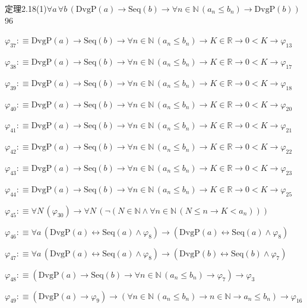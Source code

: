 \begin{fullproof}{定理2.18(1)}{$\forall a\,\forall b\,(\mathrm{DvgP}(a) \to \mathrm{Seq}(b) \to \forall n \in \mathbb{N}\,(a_{n} \leq b_{n}) \to \mathrm{DvgP}(b))$}{96}
\begin{abbrevlist}
\item $\varphi_{37} :\equiv \mathrm{DvgP}(a) \to \mathrm{Seq}(b) \to \forall n \in \mathbb{N}\,(a_{n} \leq b_{n}) \to K \in \mathbb{R} \to 0 < K \to \varphi_{13}$
\item $\varphi_{38} :\equiv \mathrm{DvgP}(a) \to \mathrm{Seq}(b) \to \forall n \in \mathbb{N}\,(a_{n} \leq b_{n}) \to K \in \mathbb{R} \to 0 < K \to \varphi_{17}$
\item $\varphi_{39} :\equiv \mathrm{DvgP}(a) \to \mathrm{Seq}(b) \to \forall n \in \mathbb{N}\,(a_{n} \leq b_{n}) \to K \in \mathbb{R} \to 0 < K \to \varphi_{18}$
\item $\varphi_{40} :\equiv \mathrm{DvgP}(a) \to \mathrm{Seq}(b) \to \forall n \in \mathbb{N}\,(a_{n} \leq b_{n}) \to K \in \mathbb{R} \to 0 < K \to \varphi_{20}$
\item $\varphi_{41} :\equiv \mathrm{DvgP}(a) \to \mathrm{Seq}(b) \to \forall n \in \mathbb{N}\,(a_{n} \leq b_{n}) \to K \in \mathbb{R} \to 0 < K \to \varphi_{21}$
\item $\varphi_{42} :\equiv \mathrm{DvgP}(a) \to \mathrm{Seq}(b) \to \forall n \in \mathbb{N}\,(a_{n} \leq b_{n}) \to K \in \mathbb{R} \to 0 < K \to \varphi_{22}$
\item $\varphi_{43} :\equiv \mathrm{DvgP}(a) \to \mathrm{Seq}(b) \to \forall n \in \mathbb{N}\,(a_{n} \leq b_{n}) \to K \in \mathbb{R} \to 0 < K \to \varphi_{23}$
\item $\varphi_{44} :\equiv \mathrm{DvgP}(a) \to \mathrm{Seq}(b) \to \forall n \in \mathbb{N}\,(a_{n} \leq b_{n}) \to K \in \mathbb{R} \to 0 < K \to \varphi_{25}$
\item $\varphi_{45} :\equiv \forall N\,(\varphi_{30}) \to \forall N\,(\neg (N \in \mathbb{N} \land \forall n \in \mathbb{N}\,(N \leq n \to K < a_{n})))$
\item $\varphi_{46} :\equiv \forall a\,(\mathrm{DvgP}(a) \leftrightarrow \mathrm{Seq}(a) \land \varphi_{8}) \to (\mathrm{DvgP}(a) \leftrightarrow \mathrm{Seq}(a) \land \varphi_{8})$
\item $\varphi_{47} :\equiv \forall a\,(\mathrm{DvgP}(a) \leftrightarrow \mathrm{Seq}(a) \land \varphi_{8}) \to (\mathrm{DvgP}(b) \leftrightarrow \mathrm{Seq}(b) \land \varphi_{7})$
\item $\varphi_{48} :\equiv (\mathrm{DvgP}(a) \to \mathrm{Seq}(b) \to \forall n \in \mathbb{N}\,(a_{n} \leq b_{n}) \to \varphi_{7}) \to \varphi_{3}$
\item $\varphi_{49} :\equiv (\mathrm{DvgP}(a) \to \varphi_{9}) \to (\forall n \in \mathbb{N}\,(a_{n} \leq b_{n}) \to n \in \mathbb{N} \to a_{n} \leq b_{n}) \to \varphi_{16}$

\end{abbrevlist}
\end{fullproof}
